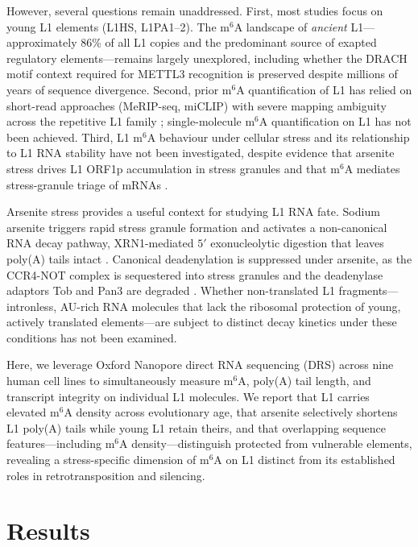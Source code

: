 \documentclass[11pt]{article}
\newcommand{\msix}{m$^6$A}
\begin{document}
However, several questions remain unaddressed. First, most studies focus
on young L1 elements (L1HS, L1PA1--2). The \msix{} landscape of
\emph{ancient} L1---approximately 86\% of all L1 copies and the
predominant source of exapted regulatory elements---remains largely
unexplored, including whether the DRACH motif context required for
METTL3 recognition is preserved despite millions of years of sequence
divergence. Second, prior \msix{} quantification of L1 has relied on
short-read approaches (MeRIP-seq, miCLIP) with severe mapping ambiguity
across the repetitive L1 family \citep{Lanciano2020}; single-molecule
\msix{} quantification on L1 has not been achieved. Third, L1 \msix{}
behaviour under cellular stress and its relationship to L1 RNA stability
have not been investigated, despite evidence that arsenite stress drives
L1 ORF1p accumulation in stress granules \citep{Goodier2007} and that
\msix{} mediates stress-granule triage of mRNAs \citep{Anders2018}.

Arsenite stress provides a useful context for studying L1 RNA fate.
Sodium arsenite triggers rapid stress granule formation and activates a
non-canonical RNA decay pathway, XRN1-mediated $5'$ exonucleolytic
digestion that leaves poly(A) tails intact \citep{deMuro2024}. Canonical
deadenylation is suppressed under arsenite, as the CCR4-NOT complex is
sequestered into stress granules \citep[preprint]{Bhatt2025} and the
deadenylase adaptors Tob and Pan3 are degraded \citep{Funakoshi2015}.
Whether non-translated L1 fragments---intronless, AU-rich RNA
molecules that lack the ribosomal protection of young, actively
translated elements---are subject to distinct decay kinetics under these
conditions has not been examined.

Here, we leverage Oxford Nanopore direct RNA sequencing (DRS) across nine
human cell lines to simultaneously measure \msix{}, poly(A) tail length,
and transcript integrity on individual L1 molecules. We report that L1
carries elevated \msix{} density across evolutionary age, that arsenite
selectively shortens L1 poly(A) tails while young L1 retain theirs, and
that overlapping sequence features---including \msix{} density---distinguish
protected from vulnerable elements, revealing a stress-specific dimension
of \msix{} on L1 distinct from its established roles in retrotransposition
and silencing.

\section{Results}
\end{document}
